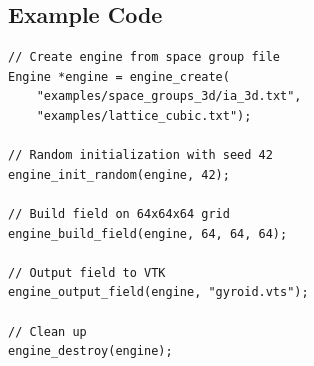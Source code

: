 \subsection{Example Code}

\begin{verbatim}
// Create engine from space group file
Engine *engine = engine_create(
    "examples/space_groups_3d/ia_3d.txt",
    "examples/lattice_cubic.txt");

// Random initialization with seed 42
engine_init_random(engine, 42);

// Build field on 64x64x64 grid
engine_build_field(engine, 64, 64, 64);

// Output field to VTK
engine_output_field(engine, "gyroid.vts");

// Clean up
engine_destroy(engine);
\end{verbatim}
